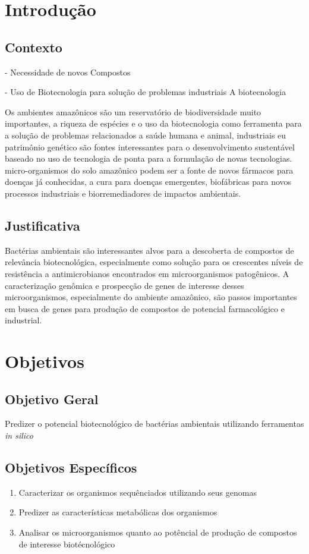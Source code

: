 \chapter{Introdução}
\label{cap:introducao}

\section{Contexto}


- Necessidade de novos Compostos

- Uso de Biotecnologia para solução de problemas industriais
A biotecnologia 

Os ambientes amazônicos são um reservatório de biodiversidade muito importantes,
a riqueza de espécies e o uso da biotecnologia como ferramenta para a solução de problemas relacionados
a saúde humana e animal, industriais eu patrimônio genético são fontes interessantes para o
desenvolvimento sustentável baseado no uso de tecnologia de ponta para a formulação de novas tecnologias.
micro-organismos do solo amazônico podem ser a fonte de novos fármacos para doenças já conhecidas,
a cura para doenças emergentes, biofábricas para novos processos industriais e biorremediadores
de impactos ambientais.

\section{Justificativa}
Bactérias ambientais são interessantes alvos para a descoberta de compostos
de relevância biotecnológica, especialmente como solução para os crescentes níveis
de resistência a antimicrobianos encontrados em microorganismos patogênicos.
A caracterização genômica e prospecção de genes de interesse desses microorganismos,
especialmente do ambiente amazônico, são passos importantes
em busca de genes para produção de compostos de potencial farmacológico e industrial.

\chapter{Objetivos}

\section{Objetivo Geral}

Predizer o potencial biotecnológico de bactérias ambientais utilizando 
ferramentas \textit{in silico} 

\section{Objetivos Específicos}
\begin{enumerate}
    \item Caracterizar os organismos sequênciados utilizando seus genomas
    \item Predizer as características metabólicas dos organismos
    \item Analisar os microorganismos quanto ao potêncial de produção de compostos de interesse biotécnológico
\end{enumerate}





